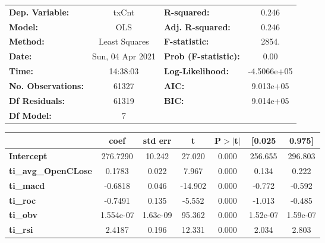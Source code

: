 \begin{center}
\begin{tabular}{lclc}
\toprule
\textbf{Dep. Variable:}     &      txCnt       & \textbf{  R-squared:         } &      0.246   \\
\textbf{Model:}             &       OLS        & \textbf{  Adj. R-squared:    } &      0.246   \\
\textbf{Method:}            &  Least Squares   & \textbf{  F-statistic:       } &      2854.   \\
\textbf{Date:}              & Sun, 04 Apr 2021 & \textbf{  Prob (F-statistic):} &      0.00    \\
\textbf{Time:}              &     14:38:03     & \textbf{  Log-Likelihood:    } & -4.5066e+05  \\
\textbf{No. Observations:}  &       61327      & \textbf{  AIC:               } &  9.013e+05   \\
\textbf{Df Residuals:}      &       61319      & \textbf{  BIC:               } &  9.014e+05   \\
\textbf{Df Model:}          &           7      & \textbf{                     } &              \\
\bottomrule
\end{tabular}
\begin{tabular}{lcccccc}
                            & \textbf{coef} & \textbf{std err} & \textbf{t} & \textbf{P$> |$t$|$} & \textbf{[0.025} & \textbf{0.975]}  \\
\midrule
\textbf{Intercept}          &     276.7290  &       10.242     &    27.020  &         0.000        &      256.655    &      296.803     \\
\textbf{ti\_avg\_OpenCLose} &       0.1783  &        0.022     &     7.967  &         0.000        &        0.134    &        0.222     \\
\textbf{ti\_macd}           &      -0.6818  &        0.046     &   -14.902  &         0.000        &       -0.772    &       -0.592     \\
\textbf{ti\_roc}            &      -0.7491  &        0.135     &    -5.552  &         0.000        &       -1.013    &       -0.485     \\
\textbf{ti\_obv}            &    1.554e-07  &     1.63e-09     &    95.362  &         0.000        &     1.52e-07    &     1.59e-07     \\
\textbf{ti\_rsi}            &       2.4187  &        0.196     &    12.331  &         0.000        &        2.034    &        2.803     \\

\end{tabular}
\end{center}
